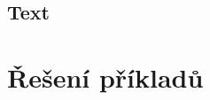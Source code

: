 \subsection{Text }
\begin{itemize}
	\blockString
	\blockDisplayPrint
	\blockDisplayClear
\end{itemize}

\newpage

\section{Řešení příkladů}\label{cha:sol}

\printsolutions

\newpage

\nocite{*}
\printbibliography[title={Zdroje}]

